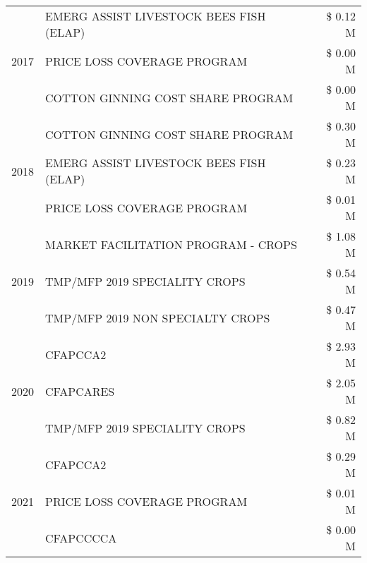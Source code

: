 \begin{tabular}{llr}
\cline{1-3}
\multirow[t]{3}{*}{2017} & EMERG ASSIST LIVESTOCK BEES FISH (ELAP) & \$ 0.12 M \\
 & PRICE LOSS COVERAGE PROGRAM & \$ 0.00 M \\
 & COTTON GINNING COST SHARE PROGRAM & \$ 0.00 M \\
\cline{1-3}
\multirow[t]{3}{*}{2018} & COTTON GINNING COST SHARE PROGRAM & \$ 0.30 M \\
 & EMERG ASSIST LIVESTOCK BEES FISH (ELAP) & \$ 0.23 M \\
 & PRICE LOSS COVERAGE PROGRAM & \$ 0.01 M \\
\cline{1-3}
\multirow[t]{3}{*}{2019} & MARKET FACILITATION PROGRAM - CROPS & \$ 1.08 M \\
 & TMP/MFP 2019 SPECIALITY CROPS & \$ 0.54 M \\
 & TMP/MFP 2019 NON SPECIALTY CROPS & \$ 0.47 M \\
\cline{1-3}
\multirow[t]{3}{*}{2020} & CFAPCCA2 & \$ 2.93 M \\
 & CFAPCARES & \$ 2.05 M \\
 & TMP/MFP 2019 SPECIALITY CROPS & \$ 0.82 M \\
\cline{1-3}
\multirow[t]{3}{*}{2021} & CFAPCCA2 & \$ 0.29 M \\
 & PRICE LOSS COVERAGE PROGRAM & \$ 0.01 M \\
 & CFAPCCCCA & \$ 0.00 M \\
\cline{1-3}
\bottomrule
\end{tabular}
